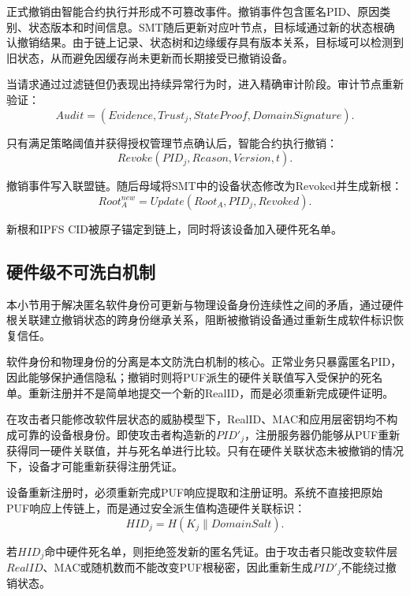 \documentclass[conference]{IEEEtran}
\begin{document}
	正式撤销由智能合约执行并形成不可篡改事件。撤销事件包含匿名PID、原因类别、状态版本和时间信息。SMT随后更新对应叶节点，目标域通过新的状态根确认撤销结果。由于链上记录、状态树和边缘缓存具有版本关系，目标域可以检测到旧状态，从而避免因缓存尚未更新而长期接受已撤销设备。
	
	当请求通过过滤链但仍表现出持续异常行为时，进入精确审计阶段。审计节点重新验证：
	\begin{equation}
		Audit=(Evidence,Trust_j,StateProof,DomainSignature).
	\end{equation}
	
	只有满足策略阈值并获得授权管理节点确认后，智能合约执行撤销：
	\begin{equation}
		Revoke(PID_j,Reason,Version,t).
	\end{equation}
	
	撤销事件写入联盟链。随后母域将SMT中的设备状态修改为Revoked并生成新根：
	\begin{equation}
		Root_A^{new}=Update(Root_A,PID_j,Revoked).
	\end{equation}
	
	新根和IPFS CID被原子锚定到链上，同时将该设备加入硬件死名单。
	
	\subsection{硬件级不可洗白机制}
	
	本小节用于解决匿名软件身份可更新与物理设备身份连续性之间的矛盾，通过硬件根关联建立撤销状态的跨身份继承关系，阻断被撤销设备通过重新生成软件标识恢复信任。
	
	软件身份和物理身份的分离是本文防洗白机制的核心。正常业务只暴露匿名PID，因此能够保护通信隐私；撤销时则将PUF派生的硬件关联值写入受保护的死名单。重新注册并不是简单地提交一个新的RealID，而是必须重新完成硬件证明。
	
	在攻击者只能修改软件层状态的威胁模型下，RealID、MAC和应用层密钥均不构成可靠的设备根身份。即使攻击者构造新的$PID'_j$，注册服务器仍能够从PUF重新获得同一硬件关联值，并与死名单进行比较。只有在硬件关联状态未被撤销的情况下，设备才可能重新获得注册凭证。
	
	设备重新注册时，必须重新完成PUF响应提取和注册证明。系统不直接把原始PUF响应上传链上，而是通过安全派生值构造硬件关联标识：
	\begin{equation}
		HID_j=H(K_j\parallel DomainSalt).
	\end{equation}
	
	若$HID_j$命中硬件死名单，则拒绝签发新的匿名凭证。由于攻击者只能改变软件层$RealID$、MAC或随机数而不能改变PUF根秘密，因此重新生成$PID'_j$不能绕过撤销状态。
	
\end{document}
